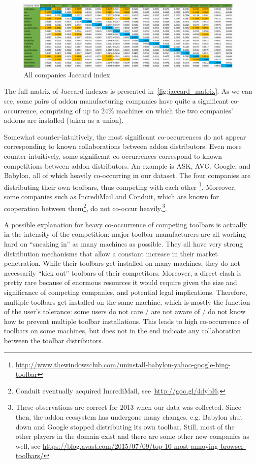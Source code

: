 \documentclass[11pt,oneside]{book}
\begin{document}
\begin{figure}[!htbp]
\centering
\includegraphics[width=\linewidth]{figures/JaccardMatrix.png}
\caption{All companies Jaccard index}
\label{fig:jaccard_matrix}
\end{figure}

The full matrix of Jaccard indexes is presented in~\autoref{fig:jaccard_matrix}. As we can see, some pairs of addon manufacturing companies have quite a significant co-occurrence, comprising of up to 24\% machines on which the two companies' addons are installed (taken as a union). 

Somewhat counter-intuitively, the most significant co-occurrences do not appear corresponding to known collaborations between addon distributors. Even more counter-intuitively, some significant co-occurrences correspond to known competitions between addon distributors. An example is ASK, AVG, Google, and Babylon, all of which heavily co-occurring in our dataset. The four companies are distributing their own toolbars, thus competing with each other \footnote{\url{http://www.thewindowsclub.com/uninstall-babylon-yahoo-google-bing-toolbar}}. Moreover, some companies such as IncrediMail and Conduit, which are known for cooperation between them\footnote{Conduit eventually acquired IncrediMail, see~\url{http://goo.gl/4dybI6}.}, do not co-occur heavily.\footnote{These observations are correct for 2013 when our data was collected. Since then, the addon ecosystem has undergone many changes, e.g. Babylon shut down and Google stopped distributing its own toolbar. Still, most of the other players in the domain exist and there are some other new companies as well, see \url{https://blog.avast.com/2015/07/09/top-10-most-annoying-browser-toolbars/}}.

A possible explanation for heavy co-occurrence of competing toolbars is actually in the intensity of the competition: major toolbar manufacturers are all working hard on ``sneaking in'' as many machines as possible. They all have very strong distribution mechanisms that allow a constant increase in their market penetration. While their toolbars get installed on many machines, they do not necessarily ``kick out'' toolbars of their competitors. Moreover, a direct clash is pretty rare because of enormous resources it would require given the size and significance of competing companies, and potential legal implications. Therefore, multiple toolbars get installed on the same machine, which is mostly the function of the user's tolerance: some users do not care / are not aware of / do not know how to prevent multiple toolbar installations. This leads to high co-occurrence of toolbars on some machines, but does not in the end indicate any collaboration between the toolbar distributors.
\end{document}
